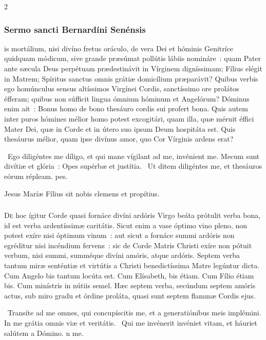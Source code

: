 \documentclass[9pt,twoside]{extarticle}
\begin{document}
\begin{multicols}{2}
\subsubsection*{\center \normalfont Sermo sancti Bernardíni Senénsis\\ }
is mortálium, nisi divíno fretus oráculo, de vera Dei et hóminis Genitríce quidquam módicum, sive grande præsúmat pollútis lábiis nomináre~: quam Pater ante sæcula Deus perpétuam prædestinávit in Vírginem digníssimam; Fílius elégit in Matrem; Spíritus sanctus omnis grátiæ domicílium præparávit? Quibus verbis ego homúnculus sensus altíssimos Virgínei Cordis, sanctíssimo ore prolátos éfferam; quibus non súfficit lingua ómnium hóminum et Angelórum? Dóminus enim ait~: Bonus homo de bono thesáuro cordis sui profert bona. Quis autem inter puros hómines mélior homo potest excogitári, quam illa, quæ méruit éffici Mater Dei, quæ in Corde et in útero suo ipsum Deum hospitáta est. Quis thesáurus mélior, quam ipse divínus amor, quo Cor Vírginis ardens erat?

~Ego diligéntes me díligo, et qui mane vígilant ad me, invénient me. Mecum sunt divítiæ et glória~: \textred{*} Opes supérbæ et justítia. ~Ut ditem diligéntes me, et thesáuros eórum répleam. pes.

\smallskip
{\small {} Jesus Maríæ Fílius sit nobis clemens et propítius.}

\subsubsection*{\center \normalfont {}}
\lettrine{D}{e} hoc ígitur Corde quasi fornáce divíni ardóris Virgo beáta prótulit verba bona, id est verba ardentíssimæ caritátis. Sicut enim a vase óptimo vino pleno, non potest exíre nisi óptimum vinum~: aut sicut a fornáce summi ardóris non egréditur nisi incéndium fervens~: sic de Corde Matris Christi exíre non pótuit verbum, nisi summi, summéque divíni amóris, atque ardóris. Septem verba tantum miræ senténtiæ et virtútis a Christi benedictíssima Matre legúntur dicta. Cum Angelo bis tantum locúta est. Cum Elísabeth, bis étiam. Cum Fílio étiam bis. Cum minístris in nútiis semel. Hæc septem verba, secúndum septem amóris actus, sub miro gradu et órdine proláta, quasi sunt septem flammæ Cordis ejus.

\smallskip
{}~Transíte ad me omnes, qui concupíscitis me, et a generatiónibus meis implémini. \textred{*} In me grátia omnis viæ et veritátis. ~Qui me invénerit invéniet vitam, et háuriet salútem a Dómino. n me.


\end{multicols}
\end{document}
